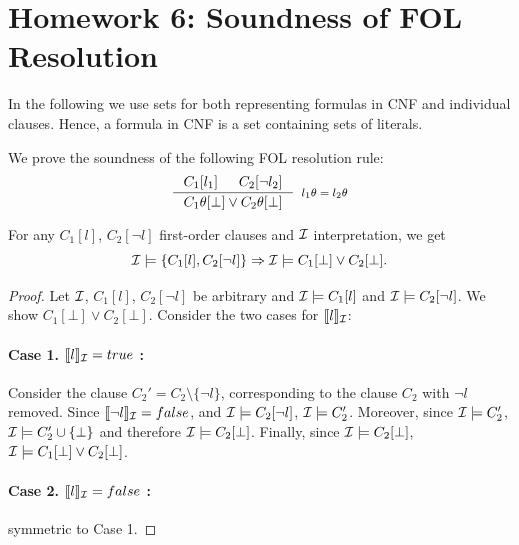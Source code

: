 \section{Homework 6: Soundness of FOL Resolution}
In the following we use sets for both representing formulas in CNF and individual clauses. Hence, a formula in CNF is a set containing sets of literals.

We prove the soundness of the following FOL resolution rule:
\[
  \inference{
    {C_1[l_1]}
     & {C_2[\neg l_2]}}
    {C_1\theta[\bot] \lor C_2\theta[\bot]}[$l_1\theta = l_2\theta$]
\]

\begin{lemma}\label{lem:1}
  For any $C_1[l]$, $C_2[\neg l]$ first-order clauses and $\mathcal{I}$ interpretation, we get
  \[\mathcal{I} \models \{C_1[l], C_2[\neg l]\} \Rightarrow \mathcal{I} \models C_1[\bot] \vee C_2[\bot].\]
\end{lemma}
\begin{proof}
  Let $\mathcal{I}$, $C_1[l]$, $C_2[\neg l]$ be arbitrary and $\mathcal{I} \models C_1[l]$ and $\mathcal{I} \models C_2[\neg l]$. We show $C_1[\bot] \lor C_2[\bot]$. Consider the two cases for $\llbracket l \rrbracket_{\mathcal{I}}$:
   \paragraph{Case 1. $\llbracket l \rrbracket_{\mathcal{I}} = true$ :}
   Consider the clause $C_2' = C_2 \setminus \{\neg l\}$, corresponding to the clause $C_2$ with $\neg l$ removed. Since  $\llbracket \neg l \rrbracket_{\mathcal{I}} = false$, and $\mathcal{I} \models C_2[\neg l]$, $\mathcal{I} \models C_2'$. Moreover, since $\mathcal{I} \models C_2'$, $\mathcal{I} \models C_2' \cup \{\bot\}$ and therefore $\mathcal{I} \models C_2[\bot]$. Finally, since $\mathcal{I} \models C_2[\bot]$, $\mathcal{I} \models C_1[\bot] \lor C_2[\bot]$.
   \paragraph{Case 2. $\llbracket l \rrbracket_{\mathcal{I}} = false$ :} symmetric to Case 1.
\end{proof}

